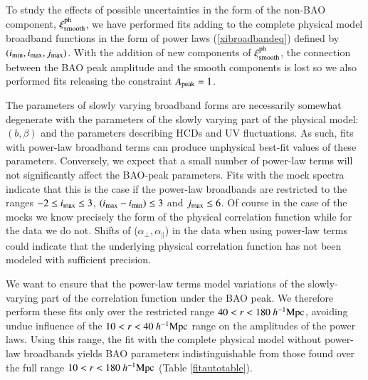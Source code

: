 \documentclass{aa}
\newcommand{\imin}{i_{\rm min}}
\newcommand{\imax}{i_{\rm max}}
\newcommand{\jmax}{j_{\rm max}}
\newcommand{\xicosmo}{\xi^{\rm ph}}
\newcommand{\apar}{\alpha_\parallel}
\newcommand{\aperp}{\alpha_\perp}
\newcommand{\hMpc}{h^{-1}{\rm Mpc}}
\newcommand{\Apeak}{A_{\rm peak}}
\begin{document}
To study the effects of possible
uncertainties in the form of the non-BAO component, $\xicosmo_{\rm smooth}$,
we have performed fits adding to the complete physical model
broadband functions in the form
of power laws (\ref{xibroadbandeq}) defined by $(\imin,\imax,\jmax)$. 
With the addition of new components of $\xicosmo_{\rm smooth}$, the
connection between the BAO peak amplitude and the smooth components
is lost so we also performed fits
releasing the constraint $\Apeak=1$.

The parameters of slowly varying broadband forms are
necessarily somewhat degenerate with the parameters of the
slowly varying part of the physical model: 
$(b,\beta)$ and the parameters describing HCDs and UV fluctuations.
As such, fits with power-law broadband terms can produce unphysical
best-fit values of these parameters.
Conversely, we expect that a small number of power-law terms
will not significantly affect the BAO-peak parameters.
Fits with the mock spectra indicate that this is the case
if the power-law broadbands are restricted to the ranges
$-2\leq\imax\leq3$, $(\imax-\imin)\leq3$
and $\jmax\leq6$.
Of course in the case of the mocks we know precisely the form
of the physical correlation function while for the data we do not.
Shifts of ($\aperp,\apar$) in the data when using
power-law terms could indicate that the underlying
physical correlation function has not been modeled with sufficient
precision.

We want to ensure that the power-law terms model variations of
the slowly-varying part of the correlation function under the
BAO peak.
We therefore perform these fits only over the restricted range
$40<r<180~\hMpc$, avoiding undue influence of the $10<r<40~\hMpc$ range
on the amplitudes of the power laws.
Using this range, the fit with the complete physical
model without power-law
broadbands yields
BAO parameters indistinguishable from those found over
the full range $10<r<180~\hMpc$  (Table \ref{fitautotable}).
\end{document}
